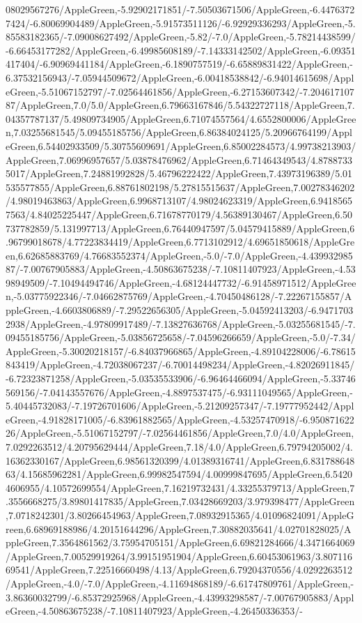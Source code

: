 {\begin{tikzternal}
08029567276/AppleGreen,-5.92902171851/-7.50503671506/AppleGreen,-6.44763727424/-6.80069904489/AppleGreen,-5.91573511126/-6.92929336293/AppleGreen,-5.85583182365/-7.09008627492/AppleGreen,-5.82/-7.0/AppleGreen,-5.78214438599/-6.66453177282/AppleGreen,-6.49985608189/-7.14333142502/AppleGreen,-6.09351417404/-6.90969441184/AppleGreen,-6.1890757519/-6.65889831422/AppleGreen,-6.37532156943/-7.05944509672/AppleGreen,-6.00418538842/-6.94014615698/AppleGreen,-5.51067152797/-7.02564461856/AppleGreen,-6.27153607342/-7.20461710787/AppleGreen,7.0/5.0/AppleGreen,6.79663167846/5.54322727118/AppleGreen,7.04357787137/5.49809734905/AppleGreen,6.71074557564/4.6552800006/AppleGreen,7.03255681545/5.09455185756/AppleGreen,6.86384024125/5.20966764199/AppleGreen,6.54402933509/5.30755609691/AppleGreen,6.85002284573/4.99738213903/AppleGreen,7.06996957657/5.03878476962/AppleGreen,6.71464349543/4.87887335017/AppleGreen,7.24881992828/5.46796222422/AppleGreen,7.43973196389/5.01535577855/AppleGreen,6.88761802198/5.27815515637/AppleGreen,7.00278346202/4.98019463863/AppleGreen,6.9968713107/4.98024623319/AppleGreen,6.94185657563/4.84025225447/AppleGreen,6.71678770179/4.56389130467/AppleGreen,6.50737782859/5.131997713/AppleGreen,6.76440947597/5.04579415889/AppleGreen,6.96799018678/4.77223834419/AppleGreen,6.7713102912/4.69651850618/AppleGreen,6.62685883769/4.76683552374/AppleGreen,-5.0/-7.0/AppleGreen,-4.43993298587/-7.00767905883/AppleGreen,-4.50863675238/-7.10811407923/AppleGreen,-4.5398949509/-7.10494494746/AppleGreen,-4.68124447732/-6.91458971512/AppleGreen,-5.03775922346/-7.04662875769/AppleGreen,-4.70450486128/-7.22267155857/AppleGreen,-4.6603806889/-7.29522656305/AppleGreen,-5.04592413203/-6.94717032938/AppleGreen,-4.97809917489/-7.13827636768/AppleGreen,-5.03255681545/-7.09455185756/AppleGreen,-5.03856725658/-7.04596266659/AppleGreen,-5.0/-7.34/AppleGreen,-5.30020218157/-6.84037966865/AppleGreen,-4.89104228006/-6.78615843419/AppleGreen,-4.72038067237/-6.70014498234/AppleGreen,-4.82026911845/-6.72323871258/AppleGreen,-5.03535533906/-6.96464466094/AppleGreen,-5.33746569156/-7.04143557676/AppleGreen,-4.8897537475/-6.93111049565/AppleGreen,-5.40445732083/-7.19726701606/AppleGreen,-5.21209257347/-7.19777952442/AppleGreen,-4.91828171005/-6.83961882565/AppleGreen,-4.53257470918/-6.95087162226/AppleGreen,-5.51067152797/-7.02564461856/AppleGreen,7.0/4.0/AppleGreen,7.0292263512/4.20795629444/AppleGreen,7.18/4.0/AppleGreen,6.79794205002/4.16362330167/AppleGreen,6.98561320399/4.01389316741/AppleGreen,6.83178864863/4.15685962281/AppleGreen,6.99982547594/4.00999847695/AppleGreen,6.54204606955/4.10572699554/AppleGreen,7.16219732431/4.33255379713/AppleGreen,7.3556668275/3.89801417835/AppleGreen,7.03428669203/3.979398477/AppleGreen,7.0718242301/3.80266454963/AppleGreen,7.08932915365/4.01096824091/AppleGreen,6.68969188986/4.20151644296/AppleGreen,7.30882035641/4.02701828025/AppleGreen,7.3564861562/3.75954705151/AppleGreen,6.69821284666/4.3471664069/AppleGreen,7.00529919264/3.99151951904/AppleGreen,6.60453061963/3.80711669541/AppleGreen,7.22516660498/4.13/AppleGreen,6.79204370556/4.0292263512/AppleGreen,-4.0/-7.0/AppleGreen,-4.11694868189/-6.61747809761/AppleGreen,-3.86360032799/-6.85372925968/AppleGreen,-4.43993298587/-7.00767905883/AppleGreen,-4.50863675238/-7.10811407923/AppleGreen,-4.26450336353/-
\end{tikzternal}}
